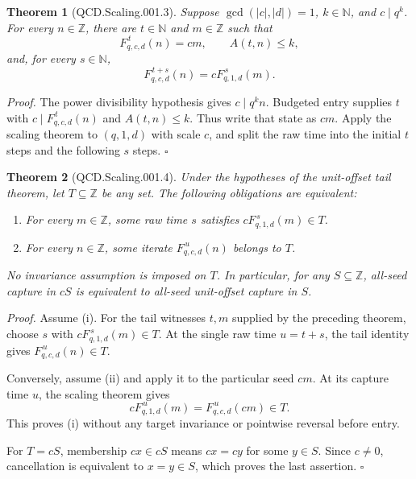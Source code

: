 \documentclass[11pt,letterpaper]{article}
\newcommand{\N}{\mathbb{N}}
\newcommand{\Z}{\mathbb{Z}}
\newtheorem{theorem}{Theorem}
\newenvironment{proof}{\noindent\textit{Proof.}}{\hfill\(\square\)}
\begin{document}
\begin{theorem}[QCD.Scaling.001.3]
Suppose \(\gcd(|c|,|d|)=1\), \(k\in\N\), and \(c\mid q^k\). For every
\(n\in\Z\), there are \(t\in\N\) and \(m\in\Z\) such that
\[
F_{q,c,d}^{\,t}(n)=cm,\qquad A(t,n)\le k,
\]
and, for every \(s\in\N\),
\[
F_{q,c,d}^{\,t+s}(n)=cF_{q,1,d}^{\,s}(m).
\]
\end{theorem}
\begin{proof}
The power divisibility hypothesis gives \(c\mid q^k n\). Budgeted entry supplies
\(t\) with \(c\mid F_{q,c,d}^{\,t}(n)\) and \(A(t,n)\le k\). Thus write that
state as \(cm\). Apply the scaling theorem to \((q,1,d)\) with scale \(c\), and
split the raw time into the initial \(t\) steps and the following \(s\) steps.
\end{proof}

\begin{theorem}[QCD.Scaling.001.4]
Under the hypotheses of the unit-offset tail theorem, let \(T\subseteq\Z\) be any
set. The following obligations are equivalent:
\begin{enumerate}[label=(\roman*)]
\item For every \(m\in\Z\), some raw time \(s\) satisfies
\(cF_{q,1,d}^{\,s}(m)\in T\).
\item For every \(n\in\Z\), some iterate \(F_{q,c,d}^{\,u}(n)\) belongs to \(T\).
\end{enumerate}
No invariance assumption is imposed on \(T\). In particular, for any
\(S\subseteq\Z\), all-seed capture in \(cS\) is equivalent to all-seed
unit-offset capture in \(S\).
\end{theorem}
\begin{proof}
Assume (i). For the tail witnesses \(t,m\) supplied by the preceding theorem,
choose \(s\) with \(cF_{q,1,d}^{\,s}(m)\in T\). At the single raw time \(u=t+s\),
the tail identity gives \(F_{q,c,d}^{\,u}(n)\in T\).

Conversely, assume (ii) and apply it to the particular seed \(cm\). At its capture
time \(u\), the scaling theorem gives
\[
cF_{q,1,d}^{\,u}(m)=F_{q,c,d}^{\,u}(cm)\in T.
\]
This proves (i) without any target invariance or pointwise reversal before entry.

For \(T=cS\), membership \(cx\in cS\) means \(cx=cy\) for some \(y\in S\).
Since \(c\ne0\), cancellation is equivalent to \(x=y\in S\), which proves the
last assertion.
\end{proof}
\end{document}
